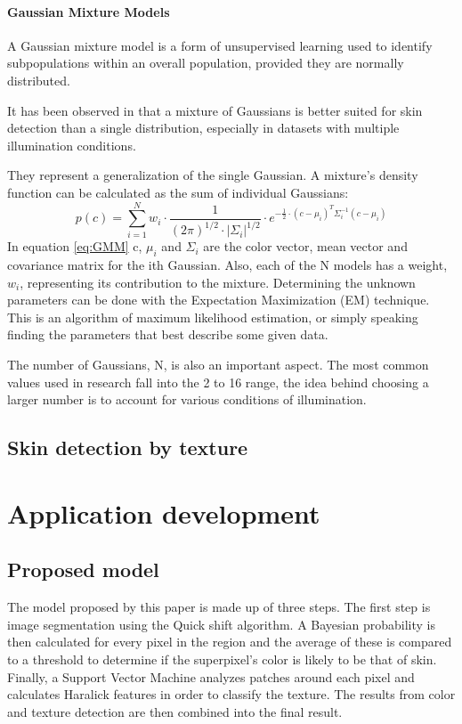 \documentclass[12pt]{report}
\begin{document}
	\subsubsection{Gaussian Mixture Models}
	A Gaussian mixture model is a form of unsupervised learning used to identify subpopulations within an overall population, provided they are normally distributed\cite{gaussian_mixtures}.
	
	It has been observed in \cite{Yang99gaussianmixture} that a mixture of Gaussians is better suited for skin detection than a single distribution, especially in datasets with multiple illumination conditions.
	
	They represent a generalization of the single Gaussian. A mixture's density function can be calculated as the sum of individual Gaussians\cite{survey_skin_color_modeling}:
	\begin{equation} \label{eq:GMM}
	p(c) = \sum_{i=1}^{N}w_i \cdot \frac{1}{(2\pi)^{1/2} \cdot |\Sigma_i|^{1/2}} \cdot e^{-\frac{1}{2} \cdot (c - \mu_i)^T\Sigma_i^{-1}(c - \mu_i)}
	\end{equation}
	In equation \ref{eq:GMM} c, \(\mu_i\) and \(\Sigma_i\) are the color vector, mean vector and covariance matrix for the ith Gaussian. Also, each of the N models has a weight, \(w_i\), representing its contribution to the mixture. Determining the unknown parameters can be done with the Expectation Maximization (EM) technique\cite{Yang99gaussianmixture}. This is an algorithm of maximum likelihood estimation, or simply speaking finding the parameters that best describe some given data.
	
	The number of Gaussians, N, is also an important aspect. The most common values used in research fall into the 2 to 16 range\cite{survey_skin_color_modeling}, the idea behind choosing a larger number is to account for various conditions of illumination.
	
	\section{Skin detection by texture}
	
	\chapter{Application development}
	
	\section{Proposed model}
	The model proposed by this paper is made up of three steps. The first step is image segmentation using the Quick shift algorithm. A Bayesian probability is then calculated for every pixel in the region and the average of these is compared to a threshold to determine if the superpixel's color is likely to be that of skin. Finally, a Support Vector Machine analyzes patches around each pixel and calculates Haralick features in order to classify the texture. The results from color and texture detection are then combined into the final result.
	
\end{document}

